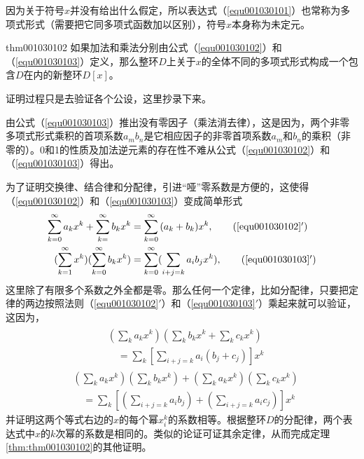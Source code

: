 因为关于符号$x$并没有给出什么假定，所以表达式（\ref{equ001030101}）也常称为多项式形式（需要把它同多项式函数加以区别），符号$x$本身称为未定元。

\begin{theorem}{}{thm001030102}
如果加法和乘法分别由公式（\ref{equ001030102}）和（\ref{equ001030103}）定义，那么整环$D$上关于$x$的全体不同的多项式形式构成一个包含$D$在内的新整环$D[x]$。
\end{theorem}

证明过程只是去验证各个公设，这里抄录下来。

由公式（\ref{equ001030103}）推出没有零因子（乘法消去律），这是因为，两个非零多项式形式乘积的首项系数$a_mb_n$是它相应因子的非零首项系数$a_m$和$b_n$的乘积（非零的）。0和1的性质及加法逆元素的存在性不难从公式（\ref{equ001030102}）和（\ref{equ001030103}）得出。

为了证明交换律、结合律和分配律，引进“哑”零系数是方便的，这使得（\ref{equ001030102}）和（\ref{equ001030103}）变成简单形式
\begin{gather}
\begin{align}
\sum_{k=0}^{\infty}{a_kx^k}+\sum_{k=}^{\infty}{b_kx^k} &= \sum_{k=0}^{\infty}{(a_k+b_k)x^k}, \tag{\ref{equ001030102}$'$} \\
(\sum_{k=1}^{\infty}{x^k})(\sum_{k=0}^{\infty}{b_kx^k})&=\sum_{k=0}^{\infty}(\sum_{i+j=k}{a_ib_jx^k}), \tag{\ref{equ001030103}$'$}
\end{align}
\end{gather}
这里除了有限多个系数之外全都是零。那么任何一个定律，比如分配律，只要把定律的两边按照法则（\ref{equ001030102}$'$）和（\ref{equ001030103}$'$）乘起来就可以验证，这因为，
\begin{gather*}
\begin{split}
&(\sum_{k}{a_kx^k})(\sum_{k}{b_kx^k}+\sum_{k}{c_kx^k})\\
&\quad =\sum_{k}{[\sum_{i+j=k}{a_i(b_j+c_j)}]x^k}
\end{split}
\end{gather*}
\[
\begin{split}
&(\sum_{k}{a_kx^k})(\sum_{k}{b_kx^k})+(\sum_{k}{a_kx^k})(\sum_{k}{c_kx^k})\\
&\quad =\sum_{k}{[(\sum_{i+j=k}{a_ib_j})+(\sum_{i+j=k}{a_ic_j})]x^k}
\end{split}
\]
并证明这两个等式右边的$x$的每个幂$x_i^k$的系数相等。根据整环$D$的分配律，两个表达式中$x$的$k$次幂的系数是相同的。类似的论证可证其余定律，从而完成定理\ref{thm:thm001030102}的其他证明。

